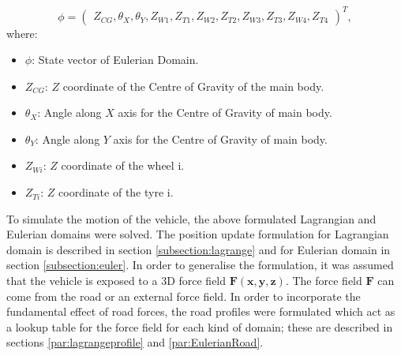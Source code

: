 \begin{equation}
     \phi = \begin{pmatrix} 
                        Z_{CG}, 
                        \theta_{X},
                        \theta_{Y},
                        Z_{W1},
                        Z_{T1},
                        Z_{W2},
                        Z_{T2},
                        Z_{W3},
                        Z_{T3},
                        Z_{W4},
                        Z_{T4}
                        \end{pmatrix}^{T},
\end{equation}
where: 
\begin{itemize}
    \item $\phi$: State vector of Eulerian Domain.
    \item $Z_{CG}$: $Z$ coordinate of the Centre of Gravity of the main body.
    \item $\theta_{X}$: Angle along $X$ axis for the Centre of Gravity of main body.
    \item $\theta_{Y}$: Angle along $Y$ axis for the Centre of Gravity of main body.
    \item $Z_{Wi}$: $Z$ coordinate of the wheel i.
    \item $Z_{Ti}$: $Z$ coordinate of the tyre i.
\end{itemize}

\noindent To simulate the motion of the vehicle, the above formulated Lagrangian and Eulerian domains were solved. The position update formulation for Lagrangian domain is described in section \ref{subsection:lagrange} and for Eulerian domain in section \ref{subsection:euler}. In order to generalise the formulation, it was assumed that the vehicle is exposed to a 3D force field $\mathbf{F(x, y, z)}$. The force field $\mathbf{F}$ can come from the road or an external force field. In order to incorporate the fundamental effect of road forces, the road profiles were formulated which act as a lookup table for the force field for each kind of domain; these are described in sections \ref{par:lagrangeprofile} and \ref{par:EulerianRoad}.


